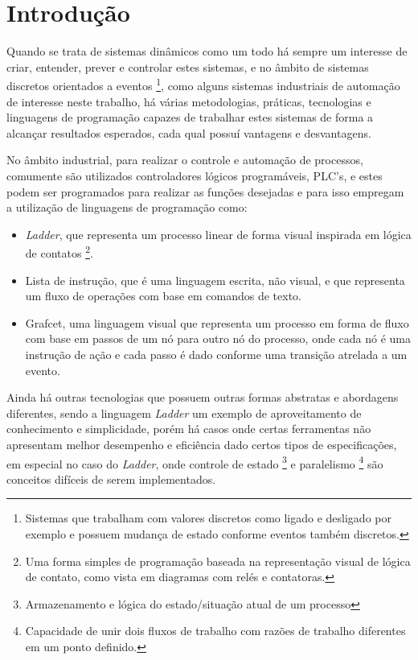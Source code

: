 \chapter{Introdução}

Quando se trata de sistemas dinâmicos como um todo há sempre um interesse de criar, entender, prever e controlar estes sistemas, e no âmbito de sistemas discretos orientados a eventos \footnote{Sistemas que trabalham com valores discretos como ligado e desligado por exemplo e possuem mudança de estado conforme eventos também discretos.}, como alguns sistemas industriais de automação de interesse neste trabalho, há várias metodologias, práticas, tecnologias e linguagens de programação capazes de trabalhar estes sistemas de forma a alcançar resultados esperados, cada qual possuí vantagens e desvantagens.

No âmbito industrial, para realizar o controle e automação de processos, comumente são utilizados controladores lógicos programáveis, PLC's, e estes podem ser programados para realizar as funções desejadas e para isso empregam a utilização de linguagens de programação como: 

\begin{itemize}
	\item \textit{Ladder}, que representa um processo linear de forma visual inspirada em lógica de contatos \footnote{Uma forma simples de programação baseada na representação visual de lógica de contato, como vista em diagramas com relés e contatoras.}.
	\item Lista de instrução, que é uma linguagem escrita, não visual, e que representa um fluxo de operações com base em comandos de texto.
	\item Grafcet, uma linguagem visual que representa um processo em forma de fluxo com base em passos de um nó para outro nó do processo, onde cada nó é uma instrução de ação e cada passo é dado conforme uma transição atrelada a um evento. 
\end{itemize}

Ainda há outras tecnologias que possuem outras formas abstratas e abordagens diferentes, sendo a linguagem \textit{Ladder} um exemplo de aproveitamento de conhecimento e simplicidade, porém há casos onde certas ferramentas não apresentam melhor desempenho e eficiência dado certos tipos de especificações, em especial no caso do \textit{Ladder}, onde controle de estado \footnote{Armazenamento e lógica do estado/situação atual de um processo} e paralelismo \footnote{Capacidade de unir dois fluxos de trabalho com razões de trabalho diferentes em um ponto definido.} são conceitos difíceis de serem implementados. 

